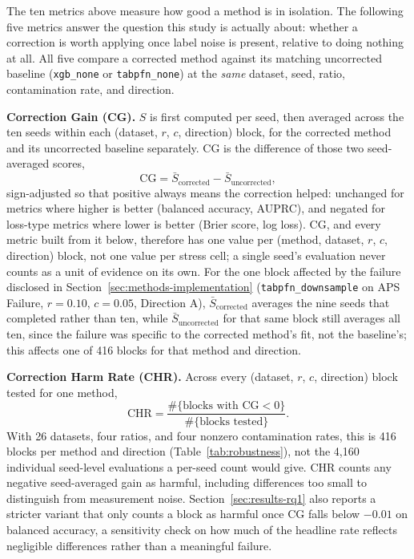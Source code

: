 The ten metrics above measure how good a method is in isolation. The
following five metrics answer the question this study is actually about:
whether a correction is worth applying once label noise is present, relative
to doing nothing at all. All five compare a corrected method against its
matching uncorrected baseline (\texttt{xgb\_none} or \texttt{tabpfn\_none})
at the \emph{same} dataset, seed, ratio, contamination rate, and direction.

\textbf{Correction Gain (CG).} $S$ is first computed per seed, then
averaged across the ten seeds within each (dataset, $r$, $c$, direction)
block, for the corrected method and its uncorrected baseline separately.
CG is the difference of those two seed-averaged scores,
\begin{equation}
\text{CG} = \bar{S}_{\text{corrected}} - \bar{S}_{\text{uncorrected}},
\label{eq:cg}
\end{equation}
sign-adjusted so that positive always means the correction helped: unchanged
for metrics where higher is better (balanced accuracy, AUPRC), and negated
for loss-type metrics where lower is better (Brier score, log loss). CG,
and every metric built from it below, therefore has one value per (method,
dataset, $r$, $c$, direction) block, not one value per stress cell; a
single seed's evaluation never counts as a unit of evidence on its own.
For the one block affected by the failure disclosed in
Section~\ref{sec:methods-implementation} (\texttt{tabpfn\_downsample} on
APS Failure, $r{=}0.10$, $c{=}0.05$, Direction A), $\bar{S}_{\text{corrected}}$
averages the nine seeds that completed rather than ten, while
$\bar{S}_{\text{uncorrected}}$ for that same block still averages all ten,
since the failure was specific to the corrected method's fit, not the
baseline's; this affects one of 416 blocks for that method and direction.

\textbf{Correction Harm Rate (CHR).} Across every (dataset, $r$, $c$,
direction) block tested for one method,
\begin{equation}
\text{CHR} = \frac{\#\{\text{blocks with CG} < 0\}}{\#\{\text{blocks tested}\}}.
\label{eq:chr}
\end{equation}
With 26 datasets, four ratios, and four nonzero contamination rates, this
is 416 blocks per method and direction (Table~\ref{tab:robustness}), not
the 4,160 individual seed-level evaluations a per-seed count would give.
CHR counts any negative seed-averaged gain as harmful, including
differences too small to distinguish from measurement noise.
Section~\ref{sec:results-rq1} also
reports a stricter variant that only counts a block as harmful once CG
falls below $-0.01$ on balanced accuracy, a sensitivity check on how much
of the headline rate reflects negligible differences rather than a
meaningful failure.

